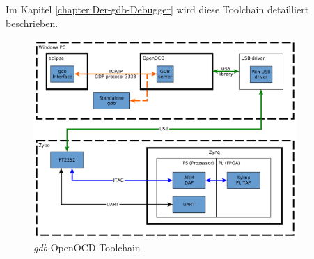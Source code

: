 Im Kapitel \ref{chapter:Der-gdb-Debugger} wird diese Toolchain detailliert beschrieben.


\begin{figure}[htbp]
	\centering
		\includegraphics[width=10cm,height=\textheight,keepaspectratio]{graphs/gdbOpenOCDToolchain.png}
	\caption{\textit{gdb}-OpenOCD-Toolchain}
	\label{fig:gdbOpenOCDToolchain}
\end{figure}